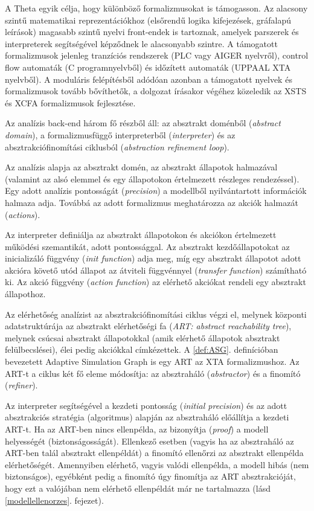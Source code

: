 A Theta egyik célja, hogy különböző formalizmusokat is támogasson. Az alacsony szintű matematikai reprezentációkhoz (elsőrendű logika kifejezések, gráfalapú leírások) magasabb szintű nyelvi front-endek is tartoznak, amelyek parszerek és interpreterek segítségével képződnek le alacsonyabb szintre. A támogatott formalizmusok jelenleg tranzíciós rendszerek (PLC vagy AIGER nyelvről), control flow automaták (C programnyelvből) és időzített automaták (UPPAAL XTA nyelvből). A moduláris felépítésből adódóan azonban a támogatott nyelvek és formalizmusok tovább bővíthetők, a dolgozat írásakor végéhez közeledik az XSTS és XCFA formalizmusok fejlesztése.

Az analízis back-end három fő részből áll: az absztrakt doménből (\emph{abstract domain}), a formalizmusfüggő interpreterből (\emph{interpreter}) és az absztrakciófinomítási ciklusból (\emph{abstraction refinement loop}).

Az analízis alapja az absztrakt domén, az absztrakt állapotok halmazával (valamint az alsó elemmel és egy állapotokon értelmezett részleges rendezéssel). Egy adott analízis pontosságát (\emph{precision}) a modellből nyilvántartott információk halmaza adja. Továbbá az adott formalizmus meghatározza az akciók halmazát (\emph{actions}).

Az interpreter definiálja az absztrakt állapotokon és akciókon értelmezett működési szemantikát, adott pontossággal. Az absztrakt kezdőállapotokat az inicializáló függvény (\emph{init function}) adja meg, míg egy absztrakt állapotot adott akcióra követő utód állapot az átviteli függvénnyel (\emph{transfer function}) számítható ki. Az akció függvény (\emph{action function}) az elérhető akciókat rendeli egy absztrakt állapothoz.

Az elérhetőség analízist az absztrakciófinomítási ciklus végzi el, melynek központi adatstruktúrája az absztrakt elérhetőségi fa (\emph{ART: abstract reachability tree}), melynek csúcsai absztrakt állapotokkal (amik elérhető állapotok absztrakt felülbecslései), élei pedig akciókkal címkézettek. A \ref{def:ASG}. definícióban bevezetett Adaptive Simulation Graph is egy ART az XTA formalizmushoz. Az ART-t a ciklus két fő eleme módosítja: az absztraháló (\emph{abstractor}) és a finomító (\emph{refiner}).

Az interpreter segítségével a kezdeti pontosság (\emph{initial precision}) és az adott absztrakciós stratégia (algoritmus) alapján az absztraháló előállítja a kezdeti ART-t. Ha az ART-ben nincs ellenpélda, az bizonyítja (\emph{proof}) a modell helyességét (biztonságosságát). Ellenkező esetben (vagyis ha az absztraháló az ART-ben talál absztrakt ellenpéldát) a finomító ellenőrzi az absztrakt ellenpélda elérhetőségét. Amennyiben elérhető, vagyis valódi ellenpélda, a modell hibás (nem biztonságos), egyébként pedig a finomító úgy finomítja az ART absztrakcióját, hogy ezt a valójában nem elérhető ellenpéldát már ne tartalmazza (lásd \ref{modellellenorzes}. fejezet).

